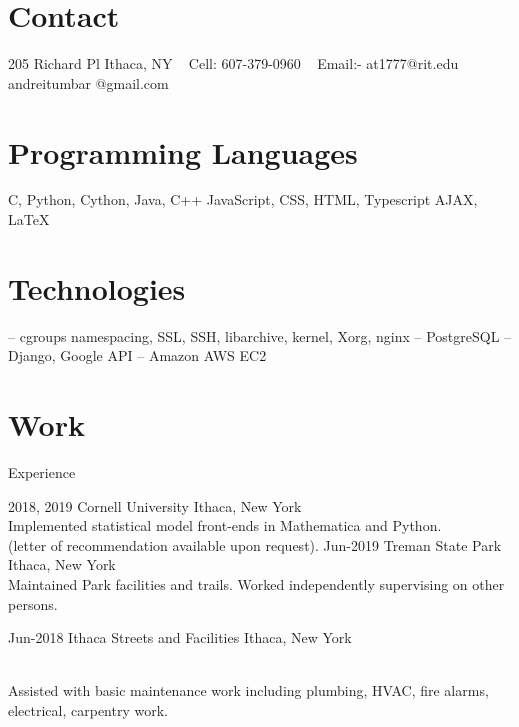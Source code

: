 \documentclass[print]{alternate}
\begin{document}


\border{}
\bordersecond{}

\begin{aside}
%
\section{Contact}
205 Richard Pl 
Ithaca, NY
~
Cell:
607-379-0960
~
Email:-
at1777@rit.edu
andreitumbar
@gmail.com
%
%
\section{Programming
   Languages}
C, Python, Cython,
Java, C++ JavaScript,
CSS, HTML, Typescript
AJAX, \LaTeX{}
%
%
\section{Technologies}
 -- cgroups namespacing, SSL, SSH, libarchive, kernel, Xorg, nginx
 -- PostgreSQL
 -- Django, Google API
 -- Amazon AWS EC2
%
\end{aside}



\section{Work}{Experience}

\begin{entrylist}
\entry
  {2018, 2019}
  {Cornell University}
  {Ithaca, New York}
  {\\
  Implemented statistical model front-ends in Mathematica and Python. \\(letter of recommendation available upon request).}
\entry
  {Jun-2019}
  {Treman State Park}
  {Ithaca, New York}
  {\\
Maintained Park facilities and trails. Worked independently supervising on other persons.
  }

\entry
  {Jun-2018}
  {Ithaca Streets and Facilities}
  {Ithaca, New York}
  {\\
Assisted with basic maintenance work including plumbing, HVAC, fire alarms, electrical, carpentry work.

  }


\end{entrylist}
\end{document}
